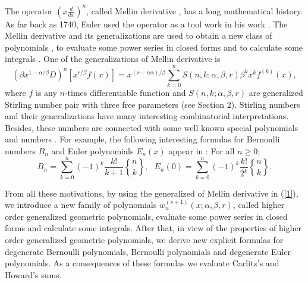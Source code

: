\documentclass{article}%
\begin{document}
The operator $\left(  x\frac{d}{dx}\right)  ^{n}$, called Mellin derivative
\cite{B2}, has a long mathematical history. As far back as 1740, Euler used
the operator as a tool work in his work \cite{Euler}. The Mellin derivative
and its generalizations are used to obtain a new class of polynomials \cite{B,
Dil1, Dil2, Kargin, MezoandRamirez}, to evaluate some power series in closed
forms \cite{B, BandDil, Dil1, Dil2, Kargin, Knopf, MezoandRamirez} and to
calculate some integrals \cite{B2, BandDil}. One of the generalizations of
Mellin derivative is
\begin{equation}
\left(  \beta x^{1-\alpha/\beta}D\right)  ^{n}\left[  x^{r/\beta}f\left(
x\right)  \right]  =x^{\left(  r-n\alpha\right)  /\beta}\sum_{k=0}^{n}S\left(
n,k;\alpha,\beta,r\right)  \beta^{k}x^{k}f^{\left(  k\right)  }\left(
x\right)  ,\label{1}%
\end{equation}
where $f$ is any $n$-times differentiable function and $S\left(
n,k;\alpha,\beta,r\right)  $ are generalized Stirling number pair with three
free parameters (see Section 2). Stirling numbers and their generalizations
have many interesting combinatorial interpretations. Besides, these numbers
are connected with some well known special polynomials and numbers
\cite{Cenkci1, Cenkci2, Dagli1, Howard1, Merca1, Merca2, Merca3, Mezo2,
Mihioubi2, Young, Young2}. For example, the following interesting formulas for
Bernoulli numbers $B_{n}$ and Euler polynomials $E_{n}\left(  x\right)  $
appear in \cite{Graham}: For all $n\geq0$;%
\begin{equation}
B_{n}=\sum_{k=0}^{n}\left(  -1\right)  ^{k}\frac{k!}{k+1}%
\genfrac{\{}{\}}{0pt}{}{n}{k}%
,\text{ \ }E_{n}\left(  0\right)  =\sum_{k=0}^{n}\left(  -1\right)  ^{k}%
\frac{k!}{2^{k}}%
\genfrac{\{}{\}}{0pt}{}{n}{k}%
.\label{14}%
\end{equation}


From all these motivations, by using the generalized of Mellin derivative in
(\ref{1}), we introduce a new family of polynomials $w_{n}^{\left(
s+1\right)  }\left(  x;\alpha,\beta,r\right)  $, called higher order
generalized geometric polynomials, evaluate some power series in closed forms
and calculate some integrals. After that, in view of the properties of higher
order generalized geometric polynomials, we derive new explicit formulas for
degenerate Bernoulli polynomials, Bernoulli polynomials and degenerate Euler
polynomials. As a consequences of these formulas we evaluate Carlitz's
\cite[Eq. (5.4)]{Carlitz} and Howard's \cite[Eq. (4.3)]{Howard2} sums.
\end{document}

